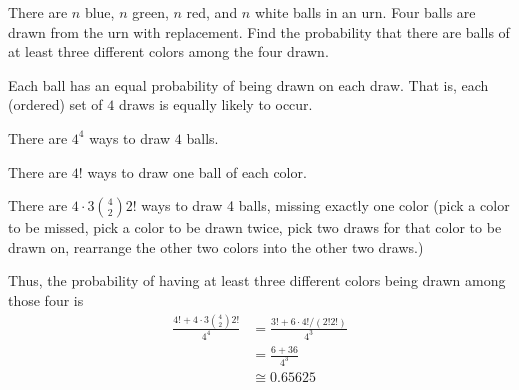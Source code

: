 \begin{problem}[Handout 2, \# 19]
  There are \(n\) blue, \(n\) green, \(n\) red, and \(n\) white balls in an
  urn. Four balls are drawn from the urn with replacement. Find the
  probability that there are balls of at least three different colors among
  the four drawn.
\end{problem}
\begin{solution}
  Each ball has an equal probability of being drawn on each draw. That is,
  each (ordered) set of \(4\) draws is equally likely to occur.

  There are $4^4$ ways to draw $4$ balls.

  There are $4!$ ways to draw one ball of each color.

  There are $\displaystyle 4\cdot 3\binom{4}{2}2!$ ways to draw 4 balls,
  missing exactly one color (pick a color to be missed, pick a color to be
  drawn twice, pick two draws for that color to be drawn on, rearrange the
  other two colors into the other two draws.)

  Thus, the probability of having at least three different colors being
  drawn among those four is
\begin{align*}
  \frac{\displaystyle 4!+4\cdot 3\binom{4}{2}2!}{4^4}
  &=\frac{3!+6\cdot 4!/(2!2!)}{4^3} \\
  &=\frac{6+36}{4^3}\\
  &\cong 0.65625\\
\end{align*}
\end{solution}

